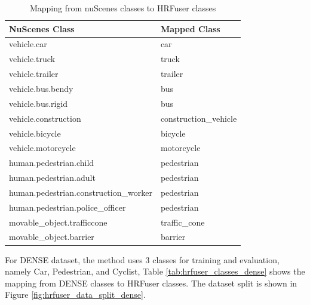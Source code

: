 \documentclass[report.tex]{subfiles}
\begin{document}
\begin{itemize}
            \begin{table}[h]
                \centering
                \caption{Mapping from nuScenes classes to HRFuser classes \cite{caesar2020nuscenes}}
                \begin{tabular}{|l|l|}
                \hline
                \textbf{NuScenes Class} & \textbf{Mapped Class} \\ \hline
                vehicle.car & car \\ \hline
                vehicle.truck & truck \\ \hline
                vehicle.trailer & trailer \\ \hline
                vehicle.bus.bendy & bus \\ \hline
                vehicle.bus.rigid & bus \\ \hline
                vehicle.construction & construction\_vehicle \\ \hline
                vehicle.bicycle & bicycle \\ \hline
                vehicle.motorcycle & motorcycle \\ \hline
                human.pedestrian.child & pedestrian \\ \hline
                human.pedestrian.adult & pedestrian \\ \hline
                human.pedestrian.construction\_worker & pedestrian \\ \hline
                human.pedestrian.police\_officer & pedestrian \\ \hline
                movable\_object.trafficcone & traffic\_cone \\ \hline
                movable\_object.barrier & barrier \\ \hline
                \end{tabular}
                \label{tab:hrfuser_classes_nuscenes}
            \end{table}
                

            For DENSE dataset, the method uses 3 classes for training and evaluation, namely Car, Pedestrian, and Cyclist, Table \ref{tab:hrfuser_classes_dense} shows the mapping from DENSE classes to HRFuser classes. The dataset split is shown in Figure \ref{fig:hrfuser_data_split_dense}.


\end{itemize}
\end{document}
